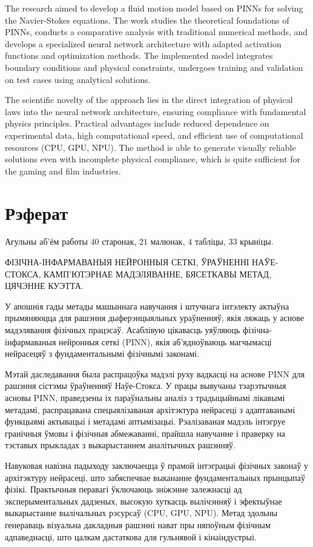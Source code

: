 The research aimed 
to develop a fluid motion model based on PINNs for solving the Navier-Stokes equations. 
The work studies the theoretical foundations of PINNs, conducts a 
comparative analysis with traditional numerical methods, and develops a specialized 
neural network architecture with adapted activation functions and optimization methods. 
The implemented model integrates boundary conditions and physical constraints, undergoes training 
and validation on test cases using analytical solutions. 

The scientific novelty of the approach lies in the direct integration of physical laws into the 
neural network architecture, ensuring compliance with fundamental physics principles. Practical 
advantages include reduced dependence on experimental data, high computational speed, 
and efficient use of computational resources (CPU, GPU, NPU). 
The method is able to generate visually reliable solutions even with incomplete physical
compliance, which is quite sufficient for the gaming and film industries.

\chapter*{Рэферат}
Агульны аб'ём работы $40$ старонак, $21$ малюнак, $4$ табліцы, $33$ крыніцы.

ФІЗІЧНА-ІНФАРМАВАНЫЯ НЕЙРОННЫЯ СЕТКІ, ЎРАЎНЕННІ НАЎЕ-СТОКСА, 
КАМП'ЮТЭРНАЕ МАДЭЛЯВАННЕ, БЯСЕТКАВЫ МЕТАД, ЦЯЧЭННЕ КУЭТТА.

У апошнія гады метады машыннага навучання і штучнага інтэлекту актыўна прымяняюцца 
для рашэння дыферэнцыяльных ураўненняў, якія ляжаць у аснове мадэлявання фізічных працэсаў. 
Асаблівую цікавасць уяўляюць фізічна-інфармаваныя нейронныя сеткі (PINN), якія 
аб'ядноўваюць магчымасці нейрасецяў з фундаментальнымі фізічнымі законамі.

Мэтай даследавання 
была распрацоўка мадэлі руху вадкасці на аснове PINN для рашэння сістэмы ўраўненняў Наўе-Стокса. 
У працы вывучаны тэарэтычныя асновы PINN, праведзены іх 
параўнальны аналіз з традыцыйнымі лікавымі метадамі, распрацавана спецыялізаваная 
архітэктура нейрасеці з адаптаванымі функцыямі актывацыі і метадамі аптымізацыі. 
Рэалізаваная мадэль інтэгруе гранічныя ўмовы і фізічныя абмежаванні, прайшла навучанне 
і праверку на тэставых прыкладах з выкарыстаннем аналітычных рашэнняў. 

Навуковая навізна падыходу заключаецца ў прамой інтэграцыі фізічных законаў у архітэктуру 
нейрасеці, што забяспечвае выкананне фундаментальных прынцыпаў фізікі. Практычныя 
перавагі ўключаюць зніжэнне залежнасці ад эксперыментальных дадзеных, высокую хуткасць 
вылічэнняў і эфектыўнае выкарыстанне вылічальных рэсурсаў (CPU, GPU, NPU). 
Метад здольны генераваць візуальна дакладныя рашэнні нават пры няпоўным фізічным
адпаведнасці, што цалкам дастаткова для гульнявой і кінаіндустрыі.

